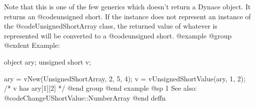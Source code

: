 Note that this is one of the few generics which doesn't return a Dynace
object.  It returns an @code{unsigned short}.  If the instance does not represent
an instance of the @code{UnsignedShortArray} class, the returned value of
whatever is represented will be converted to a @code{unsigned short}.
@example
@group
@exdent Example:

object  ary;
unsigned short   v;

ary = vNew(UnsignedShortArray, 2, 5, 4);
v = vUnsignedShortValue(ary, 1, 2);
/*  v has ary[1][2]  */
@end group
@end example
@sp 1
See also:  @code{ChangeUShortValue::NumberArray}
@end deffn




